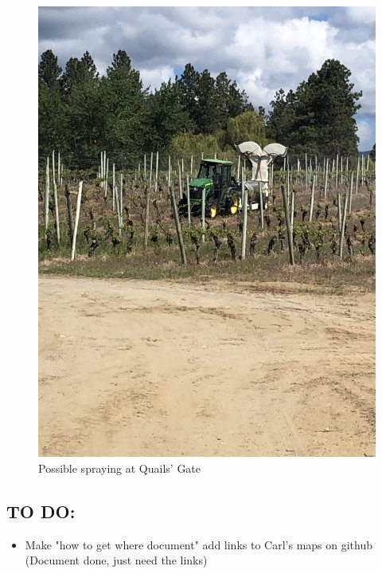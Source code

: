 \documentclass[11pt,letter]{article}
\newenvironment{smitemize}{
\begin{itemize}
  \setlength{\itemsep}{0pt}
  \setlength{\parskip}{0.8pt}
  \setlength{\parsep}{0pt}}
{\end{itemize}
}
\begin{document}
\begin{figure} [h]
  \includegraphics[scale = .1, angle = 270]{qgMaybeSpray.jpeg}
  \caption{Possible spraying at Quails' Gate }
  \label{fig:qgMaybeSpray}
\end{figure}

\subsection{TO DO:}
\begin{smitemize}
\item Make "how to get where document" add links to Carl's maps on github (Document done, just need the links)

\end{smitemize}
\end{document}
